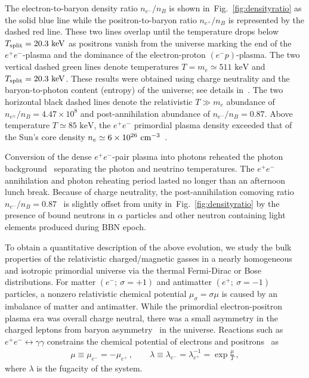 \documentclass[aps,prd,floatfix,reprint]{revtex4-2}
\newcommand*{\keV}{\text{ keV}}
\newcommand{\rf}[1]{Fig.~{\ref{#1}}}
\begin{document}
The electron-to-baryon density ratio $n_{e^{-}}/n_{B}$ is shown in~\rf{fig:densityratio} as the solid blue line while the positron-to-baryon ratio $n_{e^{+}}/n_{B}$ is represented by the dashed red line. These two lines overlap until the temperature drops below $T_{\rm split}=20.3\keV$ as positrons vanish from the universe marking the end of the $e^{+}e^{-}$-plasma and the dominance of the electron-proton $(e^{-}p)$-plasma. The two vertical dashed green lines denote temperatures $T=m_{e}\simeq511\keV$ and $T_{\rm split}=20.3\keV$. These results were obtained using charge neutrality and the baryon-to-photon content (entropy) of the universe; see details in~\cite{Rafelski:2023emw}. The two horizontal black dashed lines denote the relativistic $T\gg m_e$ abundance of $n_{e^{\pm}}/n_{B}=4.47\times10^{8}$ and post-annihilation abundance of $n_{e^{-}}/n_{B}=0.87$. Above temperature $T\simeq85\keV$, the $e^{+}e^{-}$ primordial plasma density exceeded that of the Sun's core density $n_{e}\simeq6\times10^{26}{\rm\ cm}^{-3}$~\cite{Bahcall:2000nu}. 

Conversion of the dense $e^{+}e^{-}$-pair plasma into photons reheated the photon background~\cite{Birrell:2014uka} separating the photon and neutrino temperatures. The $e^{+}e^{-}$ annihilation and photon reheating period lasted no longer than an afternoon lunch break. Because of charge neutrality, the post-annihilation comoving ratio $n_{e^{-}}/n_{B}=0.87$~\cite{Rafelski:2023emw} is slightly offset from unity in~\rf{fig:densityratio} by the presence of bound neutrons in $\alpha$ particles and other neutron containing light elements produced during BBN epoch. 

To obtain a quantitative description of the above evolution, we study the bulk properties of the relativistic charged/magnetic gasses in a nearly homogeneous and isotropic primordial universe via the thermal Fermi-Dirac or Bose distributions. For matter $(e^{-};\ \sigma=+1)$ and antimatter $(e^{+};\ \sigma=-1)$ particles, a nonzero relativistic chemical potential $\mu_{\sigma}=\sigma\mu$ is caused by an imbalance of matter and antimatter. While the primordial electron-positron plasma era was overall charge neutral, there was a small asymmetry in the charged leptons from baryon asymmetry~\cite{Fromerth:2012fe,Canetti:2012zc} in the universe. Reactions such as $e^{+}e^{-}\leftrightarrow\gamma\gamma$ constrains the chemical potential of electrons and positrons~\cite{Elze:1980er} as 
\begin{align}
 \label{cpotential}
 \mu\equiv\mu_{e^{-}}=-\mu_{e^{+}}\,,\qquad
 \lambda\equiv\lambda_{e^{-}}=\lambda_{e^{+}}^{-1}=\exp\frac{\mu}{T}\,,
\end{align}
where $\lambda$ is the fugacity of the system. 
\end{document}
